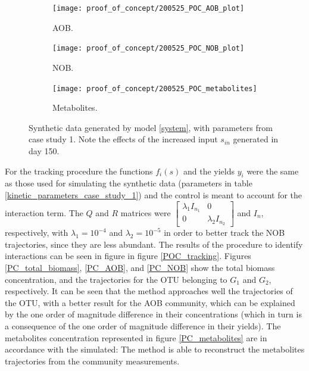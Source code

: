 \documentclass[3p,times]{article}
\begin{document}
\begin{figure}[h]
	\centering
	\begin{subfigure}{0.32 \linewidth}
 	\texttt{[image: proof\_of\_concept/200525\_POC\_AOB\_plot]}
	\caption{AOB.}
	\label{PC_synthetic_AOB}
	\end{subfigure}
	\begin{subfigure}{0.32 \linewidth}
	\centering
	\texttt{[image: proof\_of\_concept/200525\_POC\_NOB\_plot]}
	\caption{NOB.}
	\label{PC_synthetic_NOB}
	\end{subfigure}
	\begin{subfigure}{0.32 \linewidth}
	\centering
	\texttt{[image: proof\_of\_concept/200525\_POC\_metabolites]}
	\caption{Metabolites.}
	\label{PC_synthetic_metabolites}
	\end{subfigure}
	\caption{Synthetic data generated by model \eqref{system}, with parameters from case study 1. Note the effects of the increased input $s_{in}$ generated in day 150.}
	\label{synthetic_data}
\end{figure}






 For the tracking procedure the functions $f_i(s)$ and the yields $y_i$ were the same as those used for simulating the synthetic data (parameters in table \ref{kinetic_parameters_case_study_1}) and the control is meant to account for the interaction term. The $Q$ and $R$ matrices were $\begin{bmatrix}
 \lambda_1 I_{n_1} &0  \\ 0& \lambda_2 I_{n_2}
 \end{bmatrix}$ and $I_n$, respectively, with $\lambda_1 = 10^{-4}$ and $\lambda_2 = 10^{-5}$ in order to better track the NOB trajectories, since they are less abundant. The results of the procedure to identify interactions can be seen in figure in figure \ref{POC_tracking}. Figures \ref{PC_total_biomass}, \ref{PC_AOB}, and \ref{PC_NOB} show the total biomass concentration, and the trajectories for the OTU belonging to $G_1$ and $G_2$, respectively. It can be seen that the method approaches well the trajectories of the OTU, with a better result for the AOB community, which can be explained by the one order of magnitude difference in their concentrations (which in turn is a consequence of the one order of magnitude difference in their yields). The metabolites concentration represented in figure \ref{PC_metabolites} are in accordance with the simulated: The method is able to reconstruct the metabolites trajectories from the community measurements. 
\end{document}
